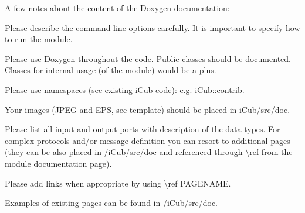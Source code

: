 A few notes about the content of the Doxygen documentation\+:
\begin{DoxyItemize}
\item Please describe the command line options carefully. It is important to specify how to run the module.
\item Please use Doxygen throughout the code. Public classes should be documented. Classes for internal usage (of the module) would be a plus.
\item Please use namespaces (see existing \mbox{\hyperlink{namespaceiCub}{i\+Cub}} code)\+: e.\+g. \mbox{\hyperlink{namespaceiCub_1_1contrib}{i\+Cub\+::contrib}}.
\item Your images (JPEG and EPS, see template) should be placed in i\+Cub/src/doc.
\item Please list all input and output ports with description of the data types. For complex protocols and/or message definition you can resort to additional pages (they can be also placed in /i\+Cub/src/doc and referenced through \textbackslash{}ref from the module documentation page).
\item Please add links when appropriate by using \textbackslash{}ref PAGENAME.
\item Examples of existing pages can be found in /i\+Cub/src/doc. 
\end{DoxyItemize}